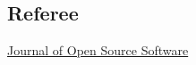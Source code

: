 \documentclass[margin]{res}
\begin{document}
\begin{resume}













\section{Referee}

\href{https://github.com/openjournals/joss-reviews/issues?utf8=✓&q=is\%3Aissue+benjaminrose+label\%3Areview}{Journal of Open Source Software}











\end{resume}
\end{document}
